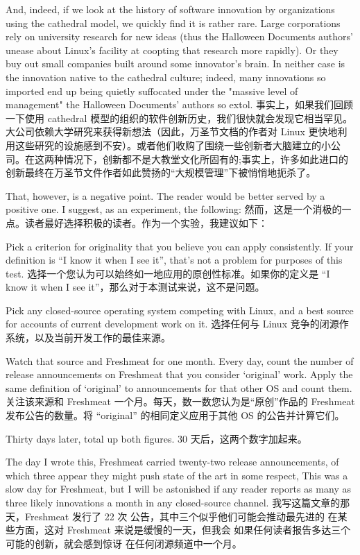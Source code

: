 \documentclass[a4paper,12pt,UTF8,twoside]{ctexbook}
\begin{document}
And, indeed, if we look at the history of software innovation by organizations using the cathedral model, we quickly find it is rather rare. Large corporations rely on university research for new ideas (thus the Halloween Documents authors' unease about Linux's facility at coopting that research more rapidly). Or they buy out small companies built around some innovator's brain. In neither case is the innovation native to the cathedral culture; indeed, many innovations so imported end up being quietly suffocated under the "massive level of management" the Halloween Documents' authors so extol.
事实上，如果我们回顾一下使用 cathedral 模型的组织的软件创新历史，我们很快就会发现它相当罕见。大公司依赖大学研究来获得新想法（因此，万圣节文档的作者对 Linux 更快地利用这些研究的设施感到不安）。或者他们收购了围绕一些创新者大脑建立的小公司。在这两种情况下，创新都不是大教堂文化所固有的;事实上，许多如此进口的创新最终在万圣节文件作者如此赞扬的“大规模管理”下被悄悄地扼杀了。

That, however, is a negative point. The reader would be better served by a positive one. I suggest, as an experiment, the following:
然而，这是一个消极的一点。读者最好选择积极的读者。作为一个实验，我建议如下：

Pick a criterion for originality that you believe you can apply consistently. If your definition is ``I know it when I see it'', that's not a problem for purposes of this test.
选择一个您认为可以始终如一地应用的原创性标准。如果你的定义是 “I know it when I see it”，那么对于本测试来说，这不是问题。

Pick any closed-source operating system competing with Linux, and a best source for accounts of current development work on it.
选择任何与 Linux 竞争的闭源作系统，以及当前开发工作的最佳来源。

Watch that source and Freshmeat for one month. Every day, count the number of release announcements on Freshmeat that you consider `original' work. Apply the same definition of `original' to announcements for that other OS and count them.
关注该来源和 Freshmeat 一个月。每天，数一数您认为是“原创”作品的 Freshmeat 发布公告的数量。将 “original” 的相同定义应用于其他 OS 的公告并计算它们。

Thirty days later, total up both figures.
30 天后，这两个数字加起来。

The day I wrote this, Freshmeat carried twenty-two release announcements, of which three appear they might push state of the art in some respect, This was a slow day for Freshmeat, but I will be astonished if any reader reports as many as three likely innovations a month in any closed-source channel.
我写这篇文章的那天，Freshmeat 发行了 22 次 公告，其中三个似乎他们可能会推动最先进的 在某些方面，这对 Freshmeat 来说是缓慢的一天，但我会 如果任何读者报告多达三个可能的创新，就会感到惊讶 在任何闭源频道中一个月。
\end{document}

